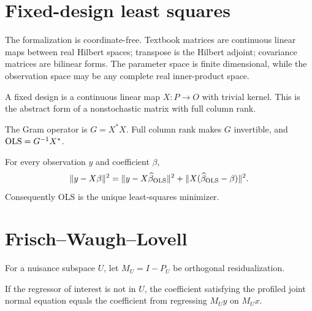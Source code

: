 \chapter{Fixed-design least squares}

The formalization is coordinate-free.  Textbook matrices are continuous linear maps between real
Hilbert spaces; transpose is the Hilbert adjoint; covariance matrices are bilinear forms.  The
parameter space is finite dimensional, while the observation space may be any complete real
inner-product space.

\begin{definition}\label{def:fixed-design}
A fixed design is a continuous linear map $X:P\to O$ with trivial kernel.  This is the abstract
form of a nonstochastic matrix with full column rank.
\leanok
\end{definition}

\begin{definition}[OLS]\label{def:ols}
The Gram operator is $G=X^*X$.  Full column rank makes $G$ invertible, and
$\operatorname{OLS}=G^{-1}X^*$.
\leanok
\end{definition}

\begin{theorem}\label{thm:ols-decomposition}
For every observation $y$ and coefficient $\beta$,
\[
 \lVert y-X\beta\rVert^2
 = \lVert y-X\widehat\beta_{\operatorname{OLS}}\rVert^2
   + \lVert X(\widehat\beta_{\operatorname{OLS}}-\beta)\rVert^2.
\]
Consequently OLS is the unique least-squares minimizer.
\leanok
\end{theorem}

\chapter{Frisch--Waugh--Lovell}

\begin{definition}[Residualization]\label{def:residualize}
For a nuisance subspace $U$, let $M_U=I-P_U$ be orthogonal residualization.
\leanok
\end{definition}

\begin{theorem}\label{thm:fwl-scalar}
If the regressor of interest is not in $U$, the coefficient satisfying the profiled joint normal
equation equals the coefficient from regressing $M_Uy$ on $M_Ux$.
\leanok
\end{theorem}

